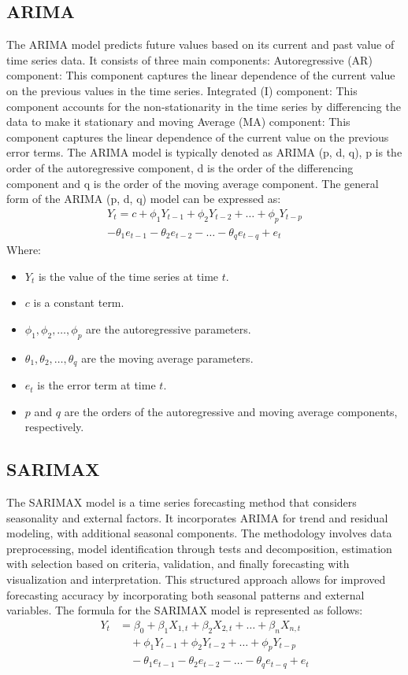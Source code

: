 \documentclass[conference]{IEEEtran}
\begin{document}
\subsection{ARIMA}
The ARIMA model predicts future values based on its current and past value of time series data. It consists of three main components: Autoregressive (AR) component: This component captures the linear dependence of the current value on the previous values in the time series. Integrated (I) component: This component accounts for the non-stationarity in the time series by differencing the data to make it stationary and moving Average (MA) component: This component captures the linear dependence of the current value on the previous error terms. The ARIMA model is typically denoted as ARIMA (p, d, q), p is the order of the autoregressive component, d is the order of the differencing component and q is the order of the moving average component. The general form of the ARIMA (p, d, q) model can be expressed as:
\begin{align*}
Y_t = c + \phi_1 Y_{t-1} + \phi_2 Y_{t-2} + \ldots + \phi_p Y_{t-p}\\ -  \theta_1 e_{t-1} - \theta_2 e_{t-2} - \ldots - \theta_q e_{t-q} + e_t
\end{align*}
Where:
\begin{itemize}
    \item $Y_t$ is the value of the time series at time $t$.
    \item $c$ is a constant term.
    \item $\phi_1, \phi_2, \ldots, \phi_p$ are the autoregressive parameters.
    \item $\theta_1, \theta_2, \ldots, \theta_q$ are the moving average parameters.
    \item $e_t$ is the error term at time $t$.
    \item $p$ and $q$ are the orders of the autoregressive and moving average components, respectively.
\end{itemize}

\subsection{SARIMAX} 

The SARIMAX model is a time series forecasting method that considers seasonality and external factors. It incorporates ARIMA for trend and residual modeling, with additional seasonal components. The methodology involves data preprocessing, model identification through tests and decomposition, estimation with selection based on criteria, validation, and finally forecasting with visualization and interpretation. This structured approach allows for improved forecasting accuracy by incorporating both seasonal patterns and external variables. The formula for the SARIMAX model is represented as follows:
\begin{align*}
Y_t &= \beta_0 + \beta_1 X_{1,t} + \beta_2 X_{2,t} + \ldots + \beta_n X_{n,t} \\
&\quad + \phi_1 Y_{t-1} + \phi_2 Y_{t-2} + \ldots + \phi_p Y_{t-p} \\
&\quad - \theta_1 e_{t-1} - \theta_2 e_{t-2} - \ldots - \theta_q e_{t-q} + e_t
\end{align*}
\end{document}
